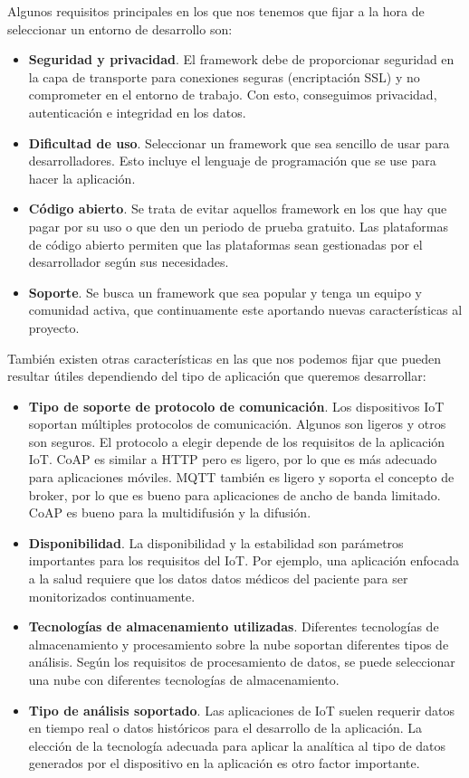 Algunos requisitos principales en los que nos tenemos que fijar a la hora de seleccionar un entorno de desarrollo son:

\begin{itemize}
    \item \textbf{Seguridad y privacidad}. El framework debe de proporcionar seguridad en la capa de transporte para conexiones seguras (encriptación SSL) y no comprometer en el entorno de trabajo. Con esto, conseguimos privacidad, autenticación e integridad en los datos. 
    \item \textbf{Dificultad de uso}. Seleccionar un framework que sea sencillo de usar para desarrolladores. Esto incluye el lenguaje de programación que se use para hacer la aplicación.
    \item \textbf{Código abierto}. Se trata de evitar aquellos framework en los que hay que pagar por su uso o que den un periodo de prueba gratuito. Las plataformas de código abierto permiten que las plataformas sean gestionadas por el desarrollador según sus necesidades.
    \item \textbf{Soporte}. Se busca un framework que sea popular y tenga un equipo y comunidad activa, que continuamente este aportando nuevas características al proyecto.
\end{itemize}

También existen otras características en las que nos podemos fijar que pueden resultar útiles dependiendo del tipo de aplicación que queremos desarrollar:

\begin{itemize}
    \item \textbf{Tipo de soporte de protocolo de comunicación}. Los dispositivos IoT soportan múltiples protocolos de comunicación. Algunos son ligeros y otros son seguros. El protocolo a elegir depende de los requisitos de la aplicación IoT. CoAP es similar a HTTP pero es ligero, por lo que es más adecuado para aplicaciones móviles. MQTT también es ligero y soporta el concepto de broker, por lo que es bueno para aplicaciones de ancho de banda limitado. CoAP es bueno para la multidifusión y la difusión.
    \item \textbf{Disponibilidad}. La disponibilidad y la estabilidad son parámetros importantes para los requisitos del IoT. Por ejemplo, una aplicación enfocada a la salud requiere que los datos datos médicos del paciente para ser monitorizados continuamente.
    \item \textbf{Tecnologías de almacenamiento utilizadas}. Diferentes tecnologías de almacenamiento y procesamiento sobre la nube soportan diferentes tipos de análisis. Según los requisitos de procesamiento de datos, se puede seleccionar una nube con diferentes tecnologías de almacenamiento.
    \item \textbf{Tipo de análisis soportado}. Las aplicaciones de IoT suelen requerir datos en tiempo real o datos históricos para el desarrollo de la aplicación. La elección de la tecnología adecuada para aplicar la analítica al tipo de datos generados por el dispositivo en la aplicación es otro factor importante.
\end{itemize}

